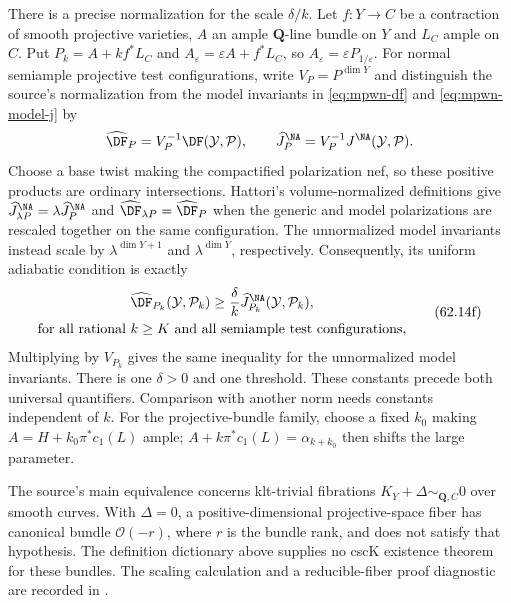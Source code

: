 There is a precise normalization for the scale $\delta/k$.
Let $f:Y\to C$ be a contraction of smooth projective varieties,
$A$ an ample
$\mathbf Q$-line bundle on $Y$ and $L_C$ ample on $C$. Put
$P_k=A+kf^*L_C$ and $A_\varepsilon=\varepsilon A+f^*L_C$,
so $A_\varepsilon=\varepsilon P_{1/\varepsilon}$.
For normal semiample projective test configurations, write
$V_P=P^{\dim Y}$ and distinguish the source's normalization
from the model invariants in \eqref{eq:mpwn-df} and
\eqref{eq:mpwn-model-j} by
\[
 \widehat{\DF}_P=V_P^{-1}\DF(\mathcal Y,\mathcal P),\qquad
 \widehat J^{\NA}_P=V_P^{-1}J^{\NA}(\mathcal Y,\mathcal P).
\]
Choose a base twist making the compactified polarization nef,
so these positive products are ordinary intersections.
Hattori's volume-normalized definitions
\cite[Definitions~2.8 and~2.18]{Hattori23CalabiYauV2} give
$\widehat J^{\NA}_{\lambda P}=\lambda\widehat J^{\NA}_P$ and
$\widehat{\DF}_{\lambda P}=\widehat{\DF}_P$ when the generic
and model polarizations are rescaled together on the same
configuration. The unnormalized model invariants instead
scale by $\lambda^{\dim Y+1}$ and $\lambda^{\dim Y}$,
respectively.
Consequently, its uniform adiabatic condition is exactly
\[
 \begin{gathered}
 \widehat{\DF}_{P_k}(\mathcal Y,\mathcal P_k)
 \geq\frac{\delta}{k}\widehat J^{\NA}_{P_k}(\mathcal Y,\mathcal P_k),\\
 \text{for all rational }k\geq K
 \text{ and all semiample test configurations},
 \end{gathered}
 \tag{62.14f}\label{eq:mpwn-adiabatic-normalization}
\]
Multiplying by $V_{P_k}$ gives the same inequality for the
unnormalized model invariants. There is one $\delta>0$ and
one threshold. These constants precede
both universal quantifiers. Comparison with another norm needs
constants independent of $k$. For the projective-bundle family,
choose a fixed $k_0$ making $A=H+k_0\pi^*c_1(L)$ ample;
$A+k\pi^*c_1(L)=\alpha_{k+k_0}$ then shifts the large parameter.

The source's main equivalence concerns klt-trivial fibrations
$K_Y+\Delta\sim_{\mathbf Q,C}0$ over smooth curves. With
$\Delta=0$, a positive-dimensional projective-space fiber has
canonical bundle $\mathcal O(-r)$, where $r$ is the bundle rank,
and does not satisfy that hypothesis. The definition dictionary
above supplies no cscK existence theorem for these bundles.
The scaling calculation and a reducible-fiber proof diagnostic
are recorded in .

